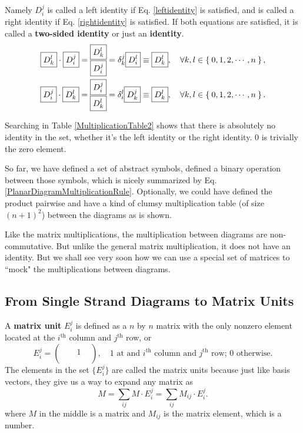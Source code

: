 \documentclass[10pt,a4paper]{article}
\newcommand{\DD}[2]{\boxed{D_{#1}^{#2}}}
\begin{document}
	Namely $\DD ij$ is called a left identity if Eq. \eqref{leftidentity} is satisfied, and is called a right identity if Eq. \eqref{rightidentity} is satisfied. If both equations are satisfied, it is called a \textbf{two-sided identity} or just an \textbf{identity}.
	\begin{align}
	\DD kl \cdot \DD ij = \substack{\DD kl\\ \DD ij} =\delta_{k}^{j} \DD il \equiv \DD kl ,\quad \forall k,l \in \Set{0,1,2,\cdots,n} \label{leftidentity},\\
	\DD ij \cdot \DD kl = \substack{\DD ij\\ \DD kl} =\delta_{i}^{l} \DD kj \equiv \DD kl ,\quad \forall k,l \in \Set{0,1,2,\cdots,n}
	\label{rightidentity}.
	\end{align}
	
	Searching in Table \ref{MultiplicationTable2} shows that there is absolutely no identity in the set, whether it's the left identity or the right identity. $0$ is trivially the zero element.
	
	So far, we have defined a set of abstract symbols, defined a binary operation between those symbols, which is nicely summarized by Eq. \eqref{PlanarDiagramMultiplicationRule}. Optionally, we could have defined the product pairwise and have a kind of clumsy multiplication table (of size $(n+1)^2$) between the diagrams as is shown.
	
	Like the matrix multiplications, the multiplication between diagrams are non-commutative. But unlike the general matrix multiplication, it does not have an identity. But we shall see very soon how we can use a special set of matrices to ``mock" the multiplications between diagrams.
	
	\subsection{From Single Strand Diagrams to Matrix Units}
	A \textbf{matrix unit} $E_i^j$ is defined as a $n$ by $n$ matrix with the only nonzero element located at the $i^{\text{th}}$ column and $j^{\text{th}}$ row, or 
	\begin{equation}
	E_i^j = 
	\begin{pmatrix}
	& & &  \\
	& &1&  \\
	& & &  \\
	& & &  
	\end{pmatrix}, \quad \text{$1$ at and $i^\text{th}$ column and $j^\text{th}$ row; $0$ otherwise}.
	\end{equation}
	The elements in the set $\{E_i^j\}$ are called the matrix units because just like basis vectors, they give us a way to expand any matrix as
	\begin{equation}
	M=\sum_{ij} M\cdot E_i^j =\sum_{ij} M_{ij}\cdot E_i^j .
	\end{equation}
	where $M$ in the middle is a matrix and $M_{ij}$ is the matrix element, which is a number. 
	
\end{document}
